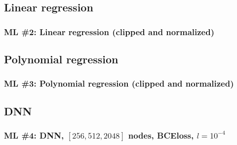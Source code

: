 \documentclass[xcolor=dvipsnames]{beamer}
\begin{document}
\subsection{Linear regression}\label{sec:LR}
\begin{frame}[fragile]
  \frametitle{ML \#2: Linear regression (clipped and normalized)}
  {\small }
\end{frame}

{
  
  
}

\subsection{Polynomial regression}\label{sec:PR}
\begin{frame}[fragile]
  \frametitle{ML \#3: Polynomial regression (clipped and normalized)}
\end{frame}

{
  
  
}

{
  
}


\subsection{DNN}\label{sec:DNN}
\begin{frame}[fragile]
  \frametitle{ML \#4: DNN, $[256,512,2048]$ nodes, BCEloss, $l = 10^{-4}$}
  {\small }
\end{frame}

{
  
  
}
\end{document}
